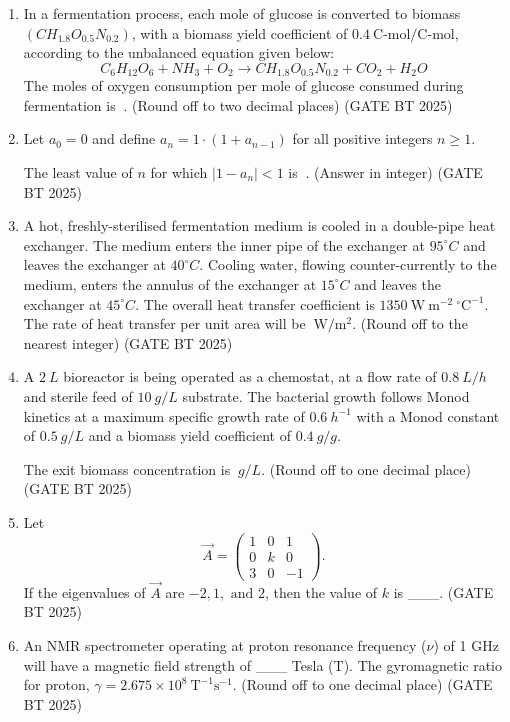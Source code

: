 \documentclass[journal,12pt,onecolumn]{IEEEtran}
\theoremstyle{remark}
\begin{document}
\begin{enumerate}
\item In a fermentation process, each mole of glucose is converted to biomass $(CH_{1.8}O_{0.5}N_{0.2})$, with a biomass yield coefficient of $0.4\ \text{C-mol/C-mol}$, according to the unbalanced equation given below:
\[
C_6H_{12}O_6 + NH_3 + O_2 \rightarrow CH_{1.8}O_{0.5}N_{0.2} + CO_2 + H_2O
\]
The moles of oxygen consumption per mole of glucose consumed during fermentation is $~$. (Round off to two decimal places)
\hfill (GATE BT 2025)

\item Let $a_0 = 0$ and define $a_n = 1 \cdot (1 + a_{n-1})$ for all positive integers $n \ge 1$.  

The least value of $n$ for which $|1 - a_n| < 1$ is $~$. (Answer in integer)  
\hfill (GATE BT 2025)

\item A hot, freshly-sterilised fermentation medium is cooled in a double-pipe heat exchanger. The medium enters the inner pipe of the exchanger at $95^\circ C$ and leaves the exchanger at $40^\circ C$. Cooling water, flowing counter-currently to the medium, enters the annulus of the exchanger at $15^\circ C$ and leaves the exchanger at $45^\circ C$. The overall heat transfer coefficient is $1350\ \mathrm{W\ m^{-2}\ ^\circ C^{-1}}$. The rate of heat transfer per unit area will be $~\mathrm{W/m^2}$. (Round off to the nearest integer)  
\hfill (GATE BT 2025)

\item A $2\ L$ bioreactor is being operated as a chemostat, at a flow rate of $0.8\ L/h$ and sterile feed of $10\ g/L$ substrate. The bacterial growth follows Monod kinetics at a maximum specific growth rate of $0.6\ h^{-1}$ with a Monod constant of $0.5\ g/L$ and a biomass yield coefficient of $0.4\ g/g$.  

The exit biomass concentration is $~g/L$. (Round off to one decimal place)  
\hfill (GATE BT 2025)

\item Let 
\[
\vec{A} = \begin{pmatrix}
1 & 0 & 1 \\
0 & k & 0 \\
3 & 0 & -1
\end{pmatrix}.
\] 
If the eigenvalues of \(\vec{A}\) are \(-2, 1, \text{ and } 2\), then the value of \(k\) is \_\_\_.  
\hfill (GATE BT 2025)

\item An NMR spectrometer operating at proton resonance frequency (\(\nu\)) of 1 GHz will have a magnetic field strength of \_\_\_ Tesla (T).  
The gyromagnetic ratio for proton, \(\gamma = 2.675 \times 10^8 \ \text{T}^{-1} \text{s}^{-1}\).  
(Round off to one decimal place)  
\hfill (GATE BT 2025)


\end{enumerate}
\end{document}
